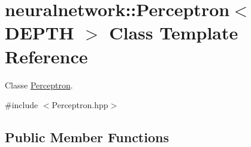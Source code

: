 \hypertarget{classneuralnetwork_1_1_perceptron}{}\section{neuralnetwork\+:\+:Perceptron$<$ D\+E\+P\+TH $>$ Class Template Reference}
\label{classneuralnetwork_1_1_perceptron}


Classe \mbox{\hyperlink{classneuralnetwork_1_1_perceptron}{Perceptron}}.  




{\ttfamily \#include $<$Perceptron.\+hpp$>$}

\subsection*{Public Member Functions}
